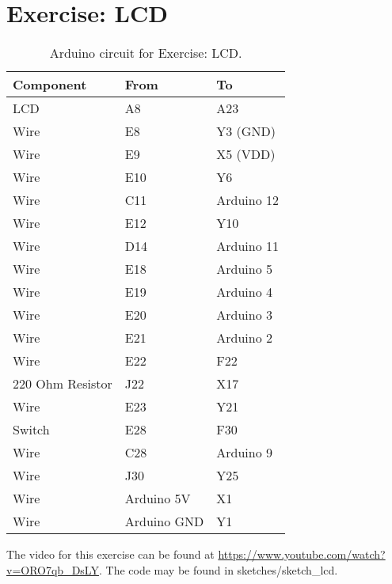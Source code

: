 \part*{Exercise: LCD}
\begin{table}[H]
	\centering
	\caption{Arduino circuit for Exercise: LCD.}
	\label{my-label}
	\begin{tabular}{|l|l|l|}
		\hline
		Component        & From        & To         \\ \hline
		LCD              & A8          & A23        \\ \hline
		Wire             & E8          & Y3 (GND)   \\ \hline
		Wire             & E9          & X5 (VDD)   \\ \hline
		Wire             & E10         & Y6         \\ \hline
		Wire             & C11         & Arduino 12 \\ \hline
		Wire             & E12         & Y10        \\ \hline
		Wire             & D14         & Arduino 11 \\ \hline
		Wire             & E18         & Arduino 5  \\ \hline
		Wire             & E19         & Arduino 4  \\ \hline
		Wire             & E20         & Arduino 3  \\ \hline
		Wire             & E21         & Arduino 2  \\ \hline
		Wire             & E22         & F22        \\ \hline
		220 Ohm Resistor & J22         & X17        \\ \hline
		Wire             & E23         & Y21        \\ \hline
		Switch           & E28         & F30        \\ \hline
		Wire             & C28         & Arduino 9  \\ \hline
		Wire             & J30         & Y25        \\ \hline
		Wire             & Arduino 5V  & X1         \\ \hline
		Wire             & Arduino GND & Y1         \\ \hline
	\end{tabular}
\end{table}
The video for this exercise can be found at \url{https://www.youtube.com/watch?v=ORO7qb_DsLY}. The code may be found in sketches/sketch\_lcd.